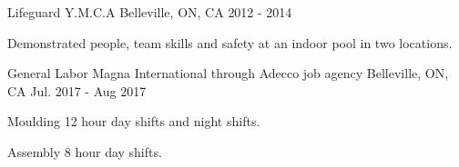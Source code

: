 

\begin{cventries}


  \cventry
    {Lifeguard} %
    {Y.M.C.A} %
    {Belleville, ON, CA} %
    {2012 - 2014} %
    {
      \begin{cvitems} %
        \item {Demonstrated people, team skills and safety at an indoor pool in two locations.}
      \end{cvitems}
    }

  \cventry
    {General Labor} %
    {Magna International through Adecco job agency} %
    {Belleville, ON, CA} %
    {Jul. 2017 - Aug 2017} %
    {
      \begin{cvitems} %
        \item {Moulding 12 hour day shifts and night shifts.}
        \item {Assembly 8 hour day shifts.}
      \end{cvitems}
    }

\end{cventries}
